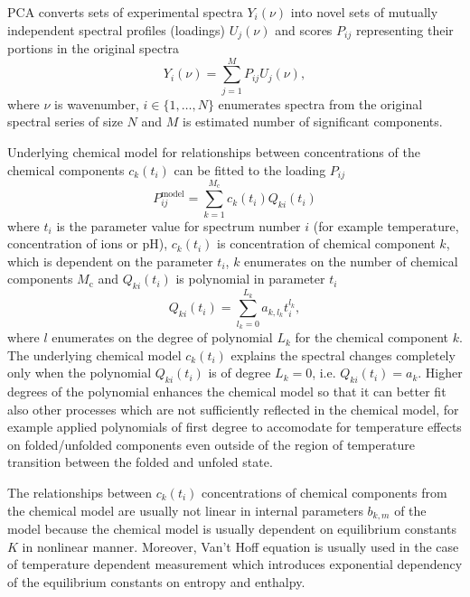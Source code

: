 PCA converts sets of experimental spectra $Y_i(\nu)$
into novel sets of mutually independent spectral profiles (loadings)
$U_j(\nu)$ and scores $P_{ij}$ representing their portions in the original
spectra
\begin{equation*}
	Y_i(\nu) = \sum_{j=1}^M P_{ij}U_j(\nu),
\end{equation*}
where $\nu$ is wavenumber, $i \in \{1,\dots,N\}$ enumerates spectra from the
original spectral series of size $N$ and $M$ is estimated number of
significant components.

Underlying chemical model for relationships between concentrations of the
chemical components $c_k(t_i)$ can be fitted to the loading $P_{ij}$
\begin{equation*}
	P_{ij}^\text{model} = \sum_{k=1}^{M_\text{c}} c_k(t_i) Q_{ki}(t_i)
\end{equation*}
where $t_i$ is the parameter value for spectrum number $i$ (for example
temperature, concentration of ions or pH),
$c_k(t_i)$ is concentration of chemical component $k$, which is dependent on
the parameter $t_i$,
$k$ enumerates on the number of chemical components $M_\text{c}$ and
$Q_{ki}(t_i)$ is polynomial in parameter $t_i$
\begin{equation*}
	Q_{ki}(t_i) = \sum_{l_k=0}^{L_k} a_{k,l_k} t_i^{l_k},
\end{equation*}
where $l$ enumerates on the degree of polynomial $L_k$ for the chemical
component $k$.
The underlying chemical model $c_k(t_i)$ explains the spectral changes
completely only when the polynomial $Q_{ki}(t_i)$ is of degree
$L_k = 0$, i.e. $Q_{ki}(t_i) = a_k$.
Higher degrees of the polynomial enhances the chemical model so that it can
better fit also other processes which are not sufficiently reflected in the
chemical model, for example
\textcite{Klener2021}
applied polynomials of first degree to accomodate for temperature effects on
folded/unfolded components even outside of the region of temperature transition
between the folded and unfoled state.

The relationships between $c_k(t_i)$ concentrations of chemical components from
the chemical model are usually not linear in internal parameters $b_{k,m}$ of
the model because the chemical model is usually dependent on equilibrium
constants $K$ in nonlinear manner.
Moreover, Van't Hoff equation is usually used in the case of temperature
dependent measurement which introduces exponential dependency of the
equilibrium constants on entropy and enthalpy.

